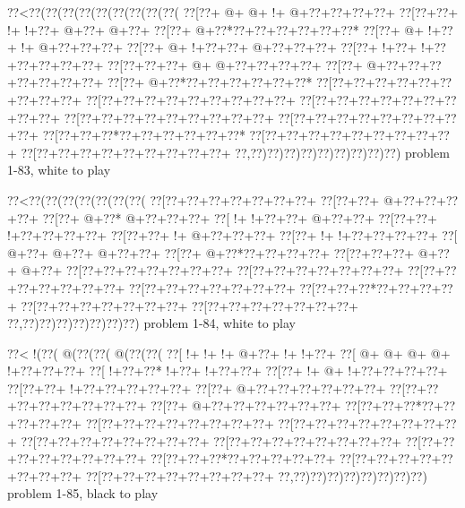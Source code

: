 \vbox{\vbox{\goo
\0??<\0??(\0??(\0??(\0??(\0??(\0??(\0??(\0??(\0??(
\0??[\0??+\- @+\- @+\- !+\- @+\0??+\0??+\0??+\0??+
\0??[\0??+\0??+\- !+\- !+\0??+\- @+\0??+\- @+\0??+
\0??[\0??+\- @+\0??*\0??+\0??+\0??+\0??+\0??+\0??*
\0??[\0??+\- @+\- !+\0??+\- !+\- @+\0??+\0??+\0??+
\0??[\0??+\- @+\- !+\0??+\0??+\- @+\0??+\0??+\0??+
\0??[\0??+\- !+\0??+\- !+\0??+\0??+\0??+\0??+\0??+
\0??[\0??+\0??+\0??+\- @+\- @+\0??+\0??+\0??+\0??+
\0??[\0??+\- @+\0??+\0??+\0??+\0??+\0??+\0??+\0??+
\0??[\0??+\- @+\0??*\0??+\0??+\0??+\0??+\0??+\0??*
\0??[\0??+\0??+\0??+\0??+\0??+\0??+\0??+\0??+\0??+
\0??[\0??+\0??+\0??+\0??+\0??+\0??+\0??+\0??+\0??+
\0??[\0??+\0??+\0??+\0??+\0??+\0??+\0??+\0??+\0??+
\0??[\0??+\0??+\0??+\0??+\0??+\0??+\0??+\0??+\0??+
\0??[\0??+\0??+\0??+\0??+\0??+\0??+\0??+\0??+\0??+
\0??[\0??+\0??+\0??*\0??+\0??+\0??+\0??+\0??+\0??*
\0??[\0??+\0??+\0??+\0??+\0??+\0??+\0??+\0??+\0??+
\0??[\0??+\0??+\0??+\0??+\0??+\0??+\0??+\0??+\0??+
\0??,\0??)\0??)\0??)\0??)\0??)\0??)\0??)\0??)\0??)
}
\hfil problem 1-83, white to play\hfil\break
}

\vbox{\vbox{\goo
\0??<\0??(\0??(\0??(\0??(\0??(\0??(\0??(
\0??[\0??+\0??+\0??+\0??+\0??+\0??+\0??+
\0??[\0??+\0??+\- @+\0??+\0??+\0??+\0??+
\0??[\0??+\- @+\0??*\- @+\0??+\0??+\0??+
\0??[\- !+\- !+\0??+\0??+\- @+\0??+\0??+
\0??[\0??+\0??+\- !+\0??+\0??+\0??+\0??+
\0??[\0??+\0??+\- !+\- @+\0??+\0??+\0??+
\0??[\0??+\- !+\- !+\0??+\0??+\0??+\0??+
\0??[\- @+\0??+\- @+\0??+\- @+\0??+\0??+
\0??[\0??+\- @+\0??*\0??+\0??+\0??+\0??+
\0??[\0??+\0??+\0??+\- @+\0??+\- @+\0??+
\0??[\0??+\0??+\0??+\0??+\0??+\0??+\0??+
\0??[\0??+\0??+\0??+\0??+\0??+\0??+\0??+
\0??[\0??+\0??+\0??+\0??+\0??+\0??+\0??+
\0??[\0??+\0??+\0??+\0??+\0??+\0??+\0??+
\0??[\0??+\0??+\0??*\0??+\0??+\0??+\0??+
\0??[\0??+\0??+\0??+\0??+\0??+\0??+\0??+
\0??[\0??+\0??+\0??+\0??+\0??+\0??+\0??+
\0??,\0??)\0??)\0??)\0??)\0??)\0??)\0??)
}
\hfil problem 1-84, white to play\hfil\break
}

\vbox{\vbox{\goo
\0??<\- !(\0??(\- @(\0??(\0??(\- @(\0??(\0??(
\0??[\- !+\- !+\- !+\- @+\0??+\- !+\- !+\0??+
\0??[\- @+\- @+\- @+\- @+\- !+\0??+\0??+\0??+
\0??[\- !+\0??+\0??*\- !+\0??+\- !+\0??+\0??+
\0??[\0??+\- !+\- @+\- !+\0??+\0??+\0??+\0??+
\0??[\0??+\0??+\- !+\0??+\0??+\0??+\0??+\0??+
\0??[\0??+\- @+\0??+\0??+\0??+\0??+\0??+\0??+
\0??[\0??+\0??+\0??+\0??+\0??+\0??+\0??+\0??+
\0??[\0??+\- @+\0??+\0??+\0??+\0??+\0??+\0??+
\0??[\0??+\0??+\0??*\0??+\0??+\0??+\0??+\0??+
\0??[\0??+\0??+\0??+\0??+\0??+\0??+\0??+\0??+
\0??[\0??+\0??+\0??+\0??+\0??+\0??+\0??+\0??+
\0??[\0??+\0??+\0??+\0??+\0??+\0??+\0??+\0??+
\0??[\0??+\0??+\0??+\0??+\0??+\0??+\0??+\0??+
\0??[\0??+\0??+\0??+\0??+\0??+\0??+\0??+\0??+
\0??[\0??+\0??+\0??*\0??+\0??+\0??+\0??+\0??+
\0??[\0??+\0??+\0??+\0??+\0??+\0??+\0??+\0??+
\0??[\0??+\0??+\0??+\0??+\0??+\0??+\0??+\0??+
\0??,\0??)\0??)\0??)\0??)\0??)\0??)\0??)\0??)
}
\hfil problem 1-85, black to play\hfil\break
}

